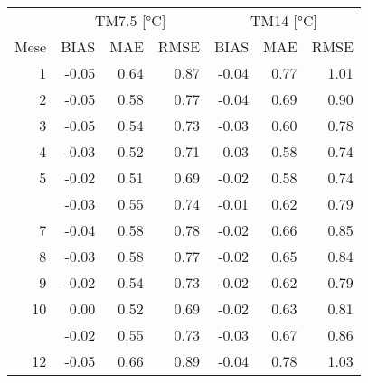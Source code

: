
\begin{tabular}[t]{rrrrrrr}
\toprule
\multicolumn{1}{c}{ } & \multicolumn{3}{c}{TM7.5 [\unit{\degreeCelsius}]} & \multicolumn{3}{c}{TM14\tnote{*} [\unit{\degreeCelsius}]} \\
\cmidrule(l{3pt}r{3pt}){2-4} \cmidrule(l{3pt}r{3pt}){5-7}
Mese & BIAS & MAE & RMSE & BIAS & MAE & RMSE\\
\midrule
1 & -0.05 & 0.64 & 0.87 & -0.04 & 0.77 & 1.01\\
2 & -0.05 & 0.58 & 0.77 & -0.04 & 0.69 & 0.90\\
3 & -0.05 & 0.54 & 0.73 & -0.03 & 0.60 & 0.78\\
4 & -0.03 & 0.52 & 0.71 & -0.03 & 0.58 & 0.74\\
5 & -0.02 & 0.51 & 0.69 & -0.02 & 0.58 & 0.74\\
\addlinespace
6 & -0.03 & 0.55 & 0.74 & -0.01 & 0.62 & 0.79\\
7 & -0.04 & 0.58 & 0.78 & -0.02 & 0.66 & 0.85\\
8 & -0.03 & 0.58 & 0.77 & -0.02 & 0.65 & 0.84\\
9 & -0.02 & 0.54 & 0.73 & -0.02 & 0.62 & 0.79\\
10 & 0.00 & 0.52 & 0.69 & -0.02 & 0.63 & 0.81\\
\addlinespace
11 & -0.02 & 0.55 & 0.73 & -0.03 & 0.67 & 0.86\\
12 & -0.05 & 0.66 & 0.89 & -0.04 & 0.78 & 1.03\\
\bottomrule
\end{tabular}